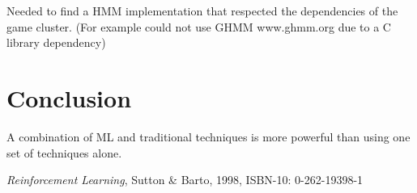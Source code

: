 \documentclass[11pt, oneside]{article}   	%
\begin{document}
Needed to find a HMM implementation that respected the dependencies of the game cluster. (For example could not use GHMM www.ghmm.org due to a C library dependency)

\section{Conclusion}
A combination of ML and traditional techniques is more powerful than using one set of techniques alone.

\begin{thebibliography}{1}

 \emph{Reinforcement Learning}, Sutton \& Barto, 1998, ISBN-10: 0-262-19398-1
 
  \end{thebibliography}
\end{document}
